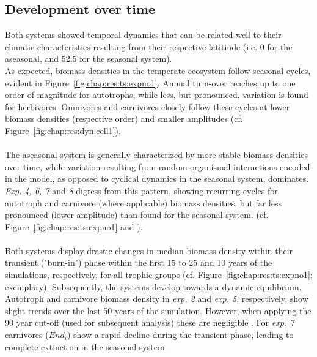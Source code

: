 \subsection{Development over time}
\label{chap:res:dyn:temporal}
Both systems showed temporal dynamics that can be related well to their climatic characteristics resulting from their respective latitiude (i.e. 0 for the aseasonal, and 52.5 for the seasonal system).\\
As expected, biomass densities in the temperate ecosystem follow seasonal cycles, evident in Figure~\ref{fig:chap:res:ts:expno1}.
 Annual turn-over reaches up to one order of magnitude for autotrophs, while less, but pronounced, variation is found for herbivores.
  Omnivores and carnivores closely follow these cycles  at lower biomass densities (respective order) and smaller amplitudes (cf. Figure~\ref{fig:chap:res:dyn:cell1}). \\\\
  The aseasonal system is generally characterized by more stable biomass densities over time, while variation resulting from random organismal interactions encoded in the model, as opposed to cyclical dynamics in the seasonal system, dominates. 
  \textit{Exp. 4, 6, 7} and \textit{8} digress from this pattern, showing recurring cycles for autotroph and carnivore (where applicable) biomass densities, but far less  pronounced (lower amplitude) than found for the seasonal system. 
(cf. Figure~\ref{fig:chap:res:ts:expno1} and ).\\\\
Both systems display drastic changes in median biomass density within their transient ("burn-in") phase within the first 15 to 25 and 10 years of the simulations, respectively, for all trophic groups (cf. Figure~\ref{fig:chap:res:ts:expno1}; exemplary). 
Subsequently, the systems develop towards a dynamic equilibrium. 
Autotroph and carnivore  biomass density in \textit{exp. 2} and \textit{exp. 5}, respectively, show slight trends over the last 50 years of the simulation. 
However, when applying the 90 year cut-off (used for subsequent analysis) these are negligible . For \textit{exp. 7} carnivores ($End_i$) show a rapid decline during the transient phase, leading to complete extinction in the seasonal system.
